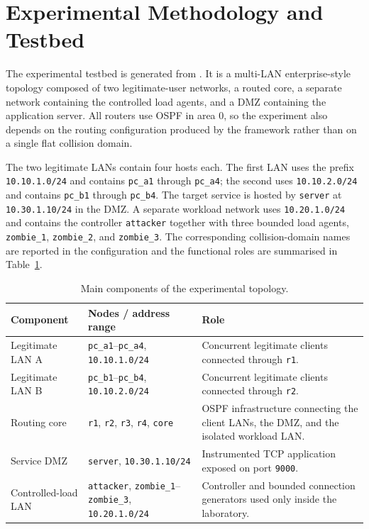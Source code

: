 \section{Experimental Methodology and Testbed}
\label{sec:experimental-methodology}

The experimental testbed is generated from . It is a
multi-LAN enterprise-style topology composed of two legitimate-user networks,
a routed core, a separate network containing the controlled load agents, and a
DMZ containing the application server. All routers use OSPF in area 0, so the
experiment also depends on the routing configuration produced by the framework
rather than on a single flat collision domain.

The two legitimate LANs contain four hosts each. The first LAN uses the
prefix \texttt{10.10.1.0/24} and contains \texttt{pc\_a1} through
\texttt{pc\_a4}; the second uses \texttt{10.10.2.0/24} and contains
\texttt{pc\_b1} through \texttt{pc\_b4}. The target service is hosted by
\texttt{server} at \texttt{10.30.1.10/24} in the DMZ. A separate workload
network uses \texttt{10.20.1.0/24} and contains the controller
\texttt{attacker} together with three bounded load agents,
\texttt{zombie\_1}, \texttt{zombie\_2}, and \texttt{zombie\_3}. The
corresponding collision-domain names are reported in the configuration and the
functional roles are summarised in Table~\ref{tab:experimental-nodes}.

\begin{table}[htbp]
\centering
\small
\begin{tabular}{p{}p{}p{}}
\toprule
\textbf{Component} & \textbf{Nodes / address range} & \textbf{Role} \\
\midrule
Legitimate LAN A & \texttt{pc\_a1}--\texttt{pc\_a4}, \texttt{10.10.1.0/24} & Concurrent legitimate clients connected through \texttt{r1}. \\
Legitimate LAN B & \texttt{pc\_b1}--\texttt{pc\_b4}, \texttt{10.10.2.0/24} & Concurrent legitimate clients connected through \texttt{r2}. \\
Routing core & \texttt{r1}, \texttt{r2}, \texttt{r3}, \texttt{r4}, \texttt{core} & OSPF infrastructure connecting the client LANs, the DMZ, and the isolated workload LAN. \\
Service DMZ & \texttt{server}, \texttt{10.30.1.10/24} & Instrumented TCP application exposed on port \texttt{9000}. \\
Controlled-load LAN & \texttt{attacker}, \texttt{zombie\_1}--\texttt{zombie\_3}, \texttt{10.20.1.0/24} & Controller and bounded connection generators used only inside the laboratory. \\
\bottomrule
\end{tabular}
\caption{Main components of the experimental topology.}
\label{tab:experimental-nodes}
\end{table}

